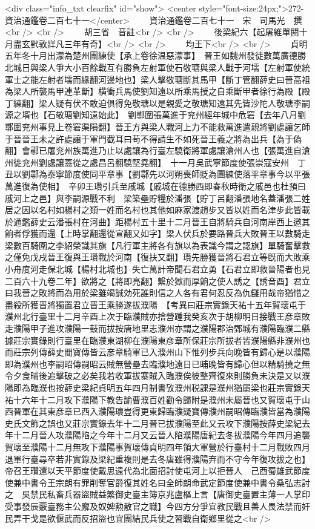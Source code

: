 <div class="info_txt clearfix" id="show">
<center style="font-size:24px;">272-資治通鑑卷二百七十一</center>
  　　資治通鑑卷二百七十一　宋　司馬光　撰<br />
<br />
　　胡三省　音註<br />
<br />
　　後梁紀六【起屠維單閼十月盡玄黓敦牂凡三年有奇】<br />
<br />
　　均王下<br />
<br />
　　貞明五年冬十月出濛為楚州團練使【承上卷徐温惡濛事】　晉王如魏州發徒數萬廣德勝北城日與梁人爭大小百餘戰互有勝負左射軍使石敬瑭與梁人戰于河壖【左射軍使統軍士之能左射者壖而緣翻河邊地也】梁人擊敬瑭斷其馬甲【斷丁管翻薛史曰晉高祖為梁人所襲馬甲連革斷】横衝兵馬使劉知遠以所乘馬授之自乘斷甲者徐行為殿【殿丁練翻】梁人疑有伏不敢迫俱得免敬瑭以是親愛之敬瑭知遠其先皆沙陀人敬瑭李嗣源之壻也【石敬瑭劉知遠始此】　劉鄩圍張萬進于兖州經年城中危窘【去年八月劉鄩圍兖州事見上卷窘渠隕翻】晉王方與梁人戰河上力不能救萬進遣親將劉處讓乞師于晉晉王未之許處讓于軍門截耳曰苟不得請生不如死晉王義之將為出兵【為于偽翻】會鄩已屠兖州族萬進乃止以處讓為行臺左驍衛將軍處讓滄州人也【張萬進自滄州徙兖州劉處讓蓋從之處昌呂翻驍堅堯翻】　十一月吳武寧節度使張崇寇安州　丁丑以劉鄩為泰寧節度使同平章事【劉鄩先以河朔喪師貶為團練使落平章事今以平張萬進復為使相】　辛卯王瓚引兵至戚城【戚城在德勝西即春秋時衛之戚邑也杜預曰戚河上之邑】與李嗣源戰不利　梁築壘貯糧於潘張【貯丁呂翻潘張地名蓋潘張二姓居之因以名村如楊村之類一姓而名村也其他如麻家渡趙步又皆以姓而名津步此皆載於通鑑薛史云潘張村在河曲】距楊村五十里十二月晉王自將騎兵自河南岸西上邀其餉者俘獲而還【上時掌翻還從宣翻又如字】梁人伏兵於要路晉兵大敗晉王以數騎走梁數百騎圍之李紹榮識其旗【凡行軍主將各有旗以為表識今謂之認旗】單騎奮擊救之僅免戊戌晉王復與王瓚戰於河南【復扶又翻】瓚先勝獲晉將石君立等旣而大敗乘小舟度河走保北城【楊村北城也】失亡萬計帝聞石君立勇【石君立即救晉陽者也見二百六十九卷二年】欲將之【將即亮翻】繫於獄而厚餉之使人誘之【誘音酉】君立曰我晉之敗將而為用於梁雖竭誠効死誰則信之人各有君何忍反為仇讎用哉帝猶惜之盡殺所獲晋將獨置君立晋王乘勝遂拔濮陽　【考異曰莊宗實錄天祐十五年賀瓌屯于濮州北行臺里十二月辛酉上次于臨濮賊亦捨營踵我癸亥次于胡柳明日接戰王彦章敗走濮陽甲子進攻濮陽一鼓而拔按唐地里志濮州亦謂之濮陽郡治鄄城有濮陽臨濮二縣據莊宗實錄則行臺里在臨濮東湖柳在濮陽東彦章所保莊宗所拔者皆濮陽縣非濮州也而莊宗列傳薛史閻寶傳皆云彦章騎軍已入濮州山下惟列步兵向晚皆有歸心是以濮陽即為濮州也李嗣昭傳嗣昭云賊無營壘去臨濮地遠日已晡晚皆有歸心但以精騎撓之無令夕食晡後追擊破之必矣我若收軍拔寨賊入臨濮俟彼整齊復來則勝負未決是又以濮陽即為臨濮也按薛史梁紀貞明五年四月制書攷濮州税課是濮州猶屬梁也莊宗實錄天祐十六年十二月攻下濮陽下教告諭曹濮百姓勸令歸附是濮州未屬晉也又賀瓌屯于山西晉軍在其東彦章已西入濮陽瓌豈得更東歸臨濮疑寶傳濮州嗣昭傳臨濮皆當為濮陽史氏文飾之誤也又莊宗實錄去年十二月晉已拔濮陽至此又云攻下濮陽按薛史梁紀去年十二月晉人攻濮陽陷之今年十二月又云晉人陷濮陽唐紀去冬拔濮陽今年四月追襲賀瓌至濮陽十二月無攻下濮陽事賀瓌傳貞明四年領大軍營於行臺村十二月戰敗四月退軍行臺尋卒若非實錄及梁紀重複則是去冬唐雖得濮陽弃而不守今年復攻拔之也】帝召王瓚還以天平節度使戴思遠代為北面招討使屯河上以拒晉人　己酉蜀雄武節度使兼中書令王宗朗有罪削奪官爵復其姓名曰全師朗命武定節度使兼中書令桑弘志討之　吳禁民私畜兵器盜賊益繁御史臺主簿京兆盧樞上言【唐御史臺置主薄一人掌印受事發辰覈臺務主公廨及奴婢勲散官之職】今四方分爭宜教民戰且善人畏法禁而奸民弄干戈是欲偃武而反招盜也宜團結民兵使之習戰自衛鄉里從之<br />
